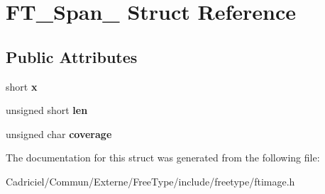 \hypertarget{struct_f_t___span__}{\section{F\-T\-\_\-\-Span\-\_\- Struct Reference}
\label{struct_f_t___span__}
}
\subsection*{Public Attributes}
\begin{DoxyCompactItemize}
\item 
\hypertarget{struct_f_t___span___a7f7235a404c66398b49c50fa09691ba5}{short {\bfseries x}}\label{struct_f_t___span___a7f7235a404c66398b49c50fa09691ba5}

\item 
\hypertarget{struct_f_t___span___a939c84317f25a97d0ba01704591a4d38}{unsigned short {\bfseries len}}\label{struct_f_t___span___a939c84317f25a97d0ba01704591a4d38}

\item 
\hypertarget{struct_f_t___span___a70f9c9e0e8d3f0b38adee03a508ae214}{unsigned char {\bfseries coverage}}\label{struct_f_t___span___a70f9c9e0e8d3f0b38adee03a508ae214}

\end{DoxyCompactItemize}


The documentation for this struct was generated from the following file\-:\begin{DoxyCompactItemize}
\item 
Cadriciel/\-Commun/\-Externe/\-Free\-Type/include/freetype/ftimage.\-h\end{DoxyCompactItemize}
